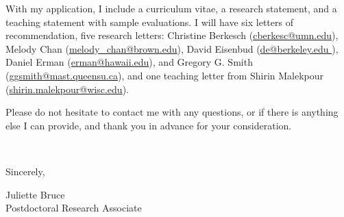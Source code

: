 \documentclass[11pt]{article}
\begin{document}


With my application, I include a curriculum vitae, a research statement, and a teaching statement with sample evaluations. I will have six letters of recommendation, five research letters: Christine Berkesch (\href{mailto:cberkesc@umn.edu}{cberkesc@umn.edu}), Melody Chan (\href{mailto:melody\_chan@brown.edu}{melody\_chan@brown.edu}), David Eisenbud (\href{mailto:de@berkeley.edu }{de@berkeley.edu }), Daniel Erman (\href{mailto:erman@hawaii.edu}{erman@hawaii.edu}), and Gregory G. Smith (\href{mailto:ggsmith@mast.queensu.ca}{ggsmith@mast.queensu.ca}), and one teaching letter from Shirin Malekpour (\href{mailto:shirin.malekpour@wisc.edu}{shirin.malekpour@wisc.edu}).  

Please do not hesitate to contact me with any questions, or if there is anything else I can provide, and thank you in advance for your consideration. 

\vspace{24pt}
\noindent
\begin{minipage}{0.99\textwidth}
\begin{minipage}{0.69\textwidth}
\textcolor{white}{.}
\end{minipage}
\begin{minipage}{0.29\textwidth}
Sincerely, 

\vspace{36pt}
Juliette Bruce\\
Postdoctoral Research Associate\end{minipage}
\end{minipage}

\end{document}
